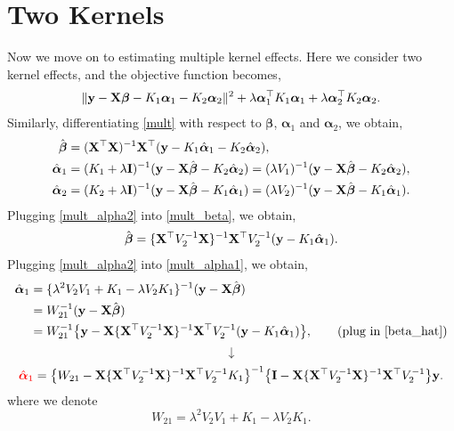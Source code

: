 \documentclass[11pt]{report}
\def\bI{{\bf I}}
\def\bX{{\bf X}}
\def\by{{\bf y}}
\def\bbeta{{\boldsymbol \beta}}
\def\balpha{{\boldsymbol \alpha}}
\begin{document}
\section{Two Kernels}
Now we move on to estimating multiple kernel effects. Here we consider two kernel effects, and the objective function becomes, 
\begin{align}
\lVert \by-\bX \bbeta -K_1 \balpha_1 -K_2 \balpha_2 \rVert^2 + \lambda \balpha_1^\top K_1 \balpha_1+ \lambda \balpha_2^\top K_2 \balpha_2. \label{mult}
\end{align}
Similarly, differentiating \eqref{mult} with respect to $\bbeta$, $\balpha_1$ and $\balpha_2$, we obtain, 
\begin{align}
\hat{\bbeta}&=(\bX^\top \bX)^{-1}\bX^\top (\by-K_1 \hat{\balpha}_1-K_2 \hat{\balpha}_2),  \label{mult_beta}\\
\hat{\balpha}_1&=(K_1+\lambda \bI)^{-1}(\by-\bX \hat{\bbeta}-K_2 \hat{\balpha}_2)=(\lambda V_1)^{-1}(\by-\bX \hat{\bbeta}-K_2 \hat{\balpha}_2), \label{mult_alpha1}\\
\hat{\balpha}_2&=(K_2+\lambda \bI)^{-1}(\by-\bX \hat{\bbeta}-K_1 \hat{\balpha}_1)=(\lambda V_2)^{-1}(\by-\bX \hat{\bbeta}-K_1 \hat{\balpha}_1). \label{mult_alpha2}
\end{align}
Plugging \eqref{mult_alpha2} into \eqref{mult_beta}, we obtain,
\begin{align}
\hat{\bbeta}=\{\bX^\top V_2^{-1} \bX \}^{-1}\bX^\top V_2^{-1}(\by-K_1 \hat{\balpha}_1). \label{beta_hat}
\end{align}
Plugging \eqref{mult_alpha2} into \eqref{mult_alpha1}, we obtain,
\begin{align}
\hat{\balpha}_1&=\{\lambda^2 V_2 V_1+K_1-\lambda V_2 K_1\}^{-1}(\by-\bX \hat{\bbeta}) \nonumber \\
&=W_{21}^{-1}(\by-\bX \hat{\bbeta}) \nonumber \\
&=W_{21}^{-1}\big\{\by-\bX \{\bX^\top V_2^{-1} \bX \}^{-1}\bX^\top V_2^{-1}(\by-K_1 \hat{\balpha}_1)\big\}, \tag{plug in \eqref{beta_hat}}
\end{align}
\[\downarrow\]
\begin{align}
{\color{red}\hat{\balpha}_1}=\big\{W_{21}-\bX \{\bX^\top V_2^{-1} \bX \}^{-1}\bX^\top V_2^{-1} K_1\big\}^{-1} \big\{\bI-\bX \{\bX^\top V_2^{-1} \bX \}^{-1}\bX^\top V_2^{-1}\big\}\by.
\end{align}
where we denote \[W_{21}=\lambda^2 V_2 V_1+K_1-\lambda V_2 K_1.\]
\end{document}
